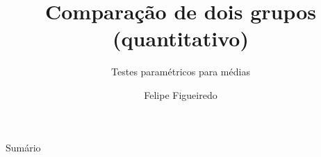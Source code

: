 \documentclass{beamer}
\title%
{Comparação de dois grupos (quantitativo)}
\subtitle
{Testes paramétricos para médias} %
\author%
{Felipe Figueiredo}%
\institute[INTO] %
{Instituto Nacional de Traumatologia e Ortopedia
}
\date%
{}
\begin{document}
\begin{frame}
  \titlepage
\end{frame}

\begin{frame}{Sumário}
  \tableofcontents
\end{frame}








\end{document}
